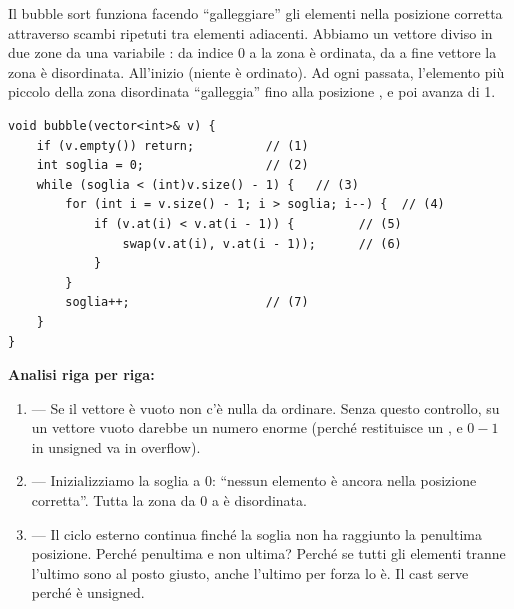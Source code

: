 \begin{soluzione}
Il bubble sort funziona facendo ``galleggiare'' gli elementi nella posizione corretta
attraverso scambi ripetuti tra elementi adiacenti.
Abbiamo un vettore diviso in due zone da una variabile :
da indice 0 a  la zona \`e ordinata, da 
a fine vettore la zona \`e disordinata.
All'inizio  (niente \`e ordinato).
Ad ogni passata, l'elemento pi\`u piccolo della zona disordinata ``galleggia''
fino alla posizione , e poi  avanza di 1.

\begin{codeexample}
  \begin{codebox}
    \begin{lstlisting}
void bubble(vector<int>& v) {
    if (v.empty()) return;          // (1)
    int soglia = 0;                 // (2)
    while (soglia < (int)v.size() - 1) {   // (3)
        for (int i = v.size() - 1; i > soglia; i--) {  // (4)
            if (v.at(i) < v.at(i - 1)) {         // (5)
                swap(v.at(i), v.at(i - 1));      // (6)
            }
        }
        soglia++;                   // (7)
    }
}
    \end{lstlisting}
  \end{codebox}
\end{codeexample}

\textbf{Analisi riga per riga:}
\begin{enumerate}
  \item {} --- Se il vettore \`e vuoto non c'\`e nulla da ordinare.
  Senza questo controllo,  su un vettore vuoto darebbe un numero enorme
  (perch\'e  restituisce un , e $0 - 1$ in unsigned va in overflow).
  
  \item {} --- Inizializziamo la soglia a 0:
  ``nessun elemento \`e ancora nella posizione corretta''.
  Tutta la zona da 0 a  \`e disordinata.
  
  \item {} --- Il ciclo esterno continua finch\'e
  la soglia non ha raggiunto la penultima posizione.
  Perch\'e penultima e non ultima? Perch\'e se tutti gli elementi tranne l'ultimo sono al posto giusto,
  anche l'ultimo per forza lo \`e.
  Il cast  serve perch\'e  \`e unsigned.
  

\end{enumerate}
\end{soluzione}
